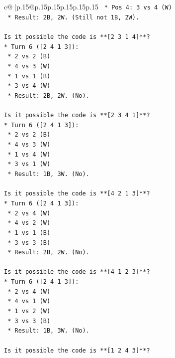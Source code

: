 \documentclass{article}
\begin{document}
{\begin{supertabular}{c@{$\;$}|p{.15\linewidth}@{}p{.15\linewidth}p{.15\linewidth}p{.15\linewidth}p{.15\linewidth}p{.15\linewidth}}
{{{\texttt{    *   Pos 4: 3 vs 4 (W)} \\
\texttt{    *   Result: 2B, 2W. (Still not 1B, 2W).} \\
\\ 
\texttt{Is it possible the code is **{[}2 3 1 4{]}**?} \\
\texttt{*   Turn 6 ({[}2 4 1 3{]}):} \\
\texttt{    *   2 vs 2 (B)} \\
\texttt{    *   4 vs 3 (W)} \\
\texttt{    *   1 vs 1 (B)} \\
\texttt{    *   3 vs 4 (W)} \\
\texttt{    *   Result: 2B, 2W. (No).} \\
\\ 
\texttt{Is it possible the code is **{[}2 3 4 1{]}**?} \\
\texttt{*   Turn 6 ({[}2 4 1 3{]}):} \\
\texttt{    *   2 vs 2 (B)} \\
\texttt{    *   4 vs 3 (W)} \\
\texttt{    *   1 vs 4 (W)} \\
\texttt{    *   3 vs 1 (W)} \\
\texttt{    *   Result: 1B, 3W. (No).} \\
\\ 
\texttt{Is it possible the code is **{[}4 2 1 3{]}**?} \\
\texttt{*   Turn 6 ({[}2 4 1 3{]}):} \\
\texttt{    *   2 vs 4 (W)} \\
\texttt{    *   4 vs 2 (W)} \\
\texttt{    *   1 vs 1 (B)} \\
\texttt{    *   3 vs 3 (B)} \\
\texttt{    *   Result: 2B, 2W. (No).} \\
\\ 
\texttt{Is it possible the code is **{[}4 1 2 3{]}**?} \\
\texttt{*   Turn 6 ({[}2 4 1 3{]}):} \\
\texttt{    *   2 vs 4 (W)} \\
\texttt{    *   4 vs 1 (W)} \\
\texttt{    *   1 vs 2 (W)} \\
\texttt{    *   3 vs 3 (B)} \\
\texttt{    *   Result: 1B, 3W. (No).} \\
\\ 
\texttt{Is it possible the code is **{[}1 2 4 3{]}**?} \\
}}}
\end{supertabular}}
\end{document}
